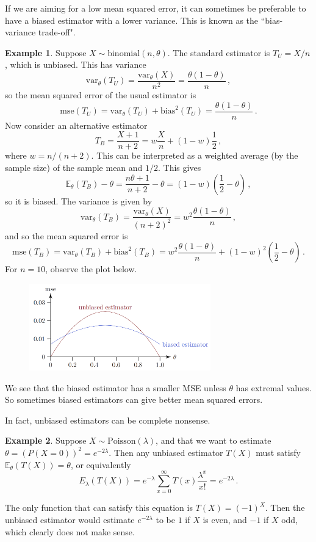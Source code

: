 \documentclass[a4paper,11pt]{article}
\theoremstyle{definition}
\newtheorem*{ex}{Example}
\numberwithin{equation}{section}
\begin{document}
If we are aiming for a low mean squared error, it can sometimes be preferable to have a biased estimator with a lower variance. This is known as the ``bias-variance trade-off".

\begin{ex}
Suppose $X\sim\text{binomial}(n,\theta)$. The standard estimator is $T_U=X/n$, which is unbiased. This has variance
\[
\text{var}_\theta(T_U)=\frac{\text{var}_\theta(X)}{n^2}=\frac{\theta(1-\theta)}{n}\,,
\]
so the mean squared error of the usual estimator is
\[
\text{mse}(T_U)=\text{var}_\theta(T_U)+\text{bias}^2(T_U)=\frac{\theta(1-\theta)}{n}\,.
\]
Now consider an alternative estimator
\[
T_B=\frac{X+1}{n+2}=w\frac{X}{n}+(1-w)\frac{1}{2}\,,
\]
where $w=n/(n+2)$. This can be interpreted as a weighted average (by the sample size) of the sample mean and $1/2$. This gives
\[
\mathbb{E}_\theta(T_B)-\theta=\frac{n\theta+1}{n+2}-\theta=(1-w)\left(\frac{1}{2}-\theta\right)\,,
\]
so it is biased. The variance is given by
\[
\text{var}_\theta(T_B)=\frac{\text{var}_\theta(X)}{(n+2)^2}=w^2\frac{\theta(1-\theta)}{n}\,,
\]
and so the mean squared error is
\[
\text{mse}(T_B)=\text{var}_\theta(T_B)+\text{bias}^2(T_B)=w^2\frac{\theta(1-\theta)}{n}+(1-w)^2\left(\frac{1}{2}-\theta\right)\,.
\]
For $n=10$, observe the plot below.
\begin{figure}[h]
    \centering
    \includegraphics[width=0.7\textwidth]{estimator.PNG}
    \label{fig:estimator}
\end{figure}
We see that the biased estimator has a smaller MSE unless $\theta$ has extremal values. So sometimes biased estimators can give better mean squared errors.
\end{ex}

In fact, unbiased estimators can be complete nonsense.

\begin{ex}
Suppose $X\sim\text{Poisson}(\lambda)$, and that we want to estimate $\theta=(P(X=0))^2=e^{-2\lambda}$. Then any unbiased estimator $T(X)$ must satisfy $\mathbb{E}_\theta(T(X))=\theta$, or equivalently
\[
E_\lambda(T(X))=e^{-\lambda}\sum_{x=0}^\infty T(x)\frac{\lambda^x}{x!}=e^{-2\lambda}\,.
\]

The only function that can satisfy this equation is $T(X)=(-1)^X$. Then the unbiased estimator would estimate $e^{-2\lambda}$ to be $1$ if $X$ is even, and $-1$ if $X$ odd, which clearly does not make sense.
\end{ex}
\end{document}
